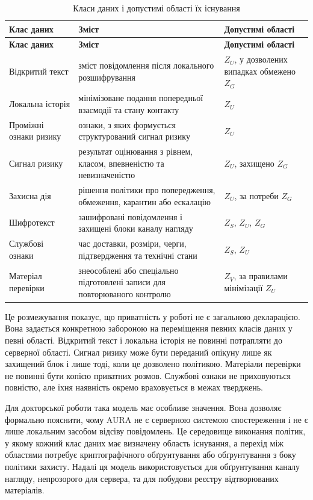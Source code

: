 \begin{longtable}{p{3.6cm} p{5.9cm} p{3.5cm}}
\caption{Класи даних і допустимі області їх існування}
\label{tab:data-classes-zones}\\
\toprule
\textbf{Клас даних} & \textbf{Зміст} & \textbf{Допустимі області} \\
\midrule
\endfirsthead
\toprule
\textbf{Клас даних} & \textbf{Зміст} & \textbf{Допустимі області} \\
\midrule
\endhead
Відкритий текст & зміст повідомлення після локального розшифрування & \(Z_U\), у дозволених випадках обмежено \(Z_G\) \\
Локальна історія & мінімізоване подання попередньої взаємодії та стану контакту & \(Z_U\) \\
Проміжні ознаки ризику & ознаки, з яких формується структурований сигнал ризику & \(Z_U\) \\
Сигнал ризику & результат оцінювання з рівнем, класом, впевненістю та невизначеністю & \(Z_U\), захищено \(Z_G\) \\
Захисна дія & рішення політики про попередження, обмеження, карантин або ескалацію & \(Z_U\), за потреби \(Z_G\) \\
Шифротекст & зашифровані повідомлення і захищені блоки каналу нагляду & \(Z_S\), \(Z_U\), \(Z_G\) \\
Службові ознаки & час доставки, розміри, черги, підтвердження та технічні стани & \(Z_S\), \(Z_U\) \\
Матеріал перевірки & знеособлені або спеціально підготовлені записи для повторюваного контролю & \(Z_V\), за правилами мінімізації \(Z_U\) \\
\bottomrule
\end{longtable}

Це розмежування показує, що приватність у роботі не є загальною декларацією. Вона задається конкретною забороною на переміщення певних класів даних у певні області. Відкритий текст і локальна історія не повинні потрапляти до серверної області. Сигнал ризику може бути переданий опікуну лише як захищений блок і лише тоді, коли це дозволено політикою. Матеріали перевірки не повинні бути копією приватних розмов. Службові ознаки не приховуються повністю, але їхня наявність окремо враховується в межах тверджень.

Для докторської роботи така модель має особливе значення. Вона дозволяє формально пояснити, чому AURA не є серверною системою спостереження і не є лише локальним засобом відсіву повідомлень. Це середовище виконання політик, у якому кожний клас даних має визначену область існування, а перехід між областями потребує криптографічного обґрунтування або обґрунтування з боку політики захисту. Надалі ця модель використовується для обґрунтування каналу нагляду, непрозорого для сервера, та для побудови реєстру відтворюваних матеріалів.

